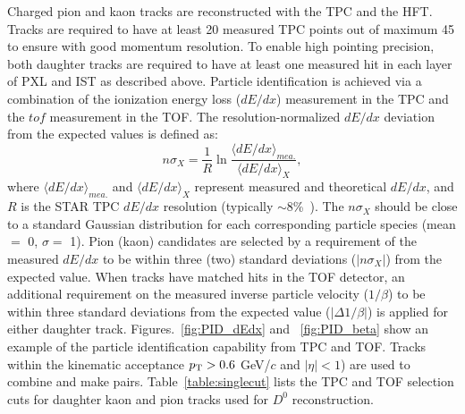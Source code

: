 \documentclass[%
 reprint,	
 amsmath,amssymb,
 aps,
 prc,
]{revtex4-1}
\begin{document}
Charged pion and kaon tracks are reconstructed with the TPC and the HFT. Tracks are required to have at least 20 measured TPC points out of maximum 45 to ensure with good momentum resolution. To enable high pointing precision, both daughter tracks are required to have at least one measured hit in each layer of PXL and IST as described above. Particle identification is achieved via a combination of the ionization energy loss ($dE/dx$) measurement in the TPC and the $tof$ measurement in the TOF. The resolution-normalized $dE/dx$ deviation from the expected values is defined as:
\begin{equation}
n\sigma_X = \frac{1}{R}\ln\frac{\langle{dE/dx}\rangle_{mea.}}{\langle{dE/dx}\rangle_{X}},
\label{equ:equation1}
\end{equation}
where $\langle{dE/dx}\rangle_{mea.}$ and $\langle{dE/dx}\rangle_{X}$ represent measured and theoretical $dE/dx$, and $R$ is the STAR TPC $dE/dx$ resolution (typically $\sim$8\%~\cite{TPC}). The $n\sigma_X$ should be close to a standard Gaussian distribution for each corresponding particle species (mean $=$ 0, $\sigma = $ 1).
Pion (kaon) candidates are selected by a requirement of the measured $dE/dx$ to be within three (two) standard deviations ($|n\sigma_{X}|$) from the expected value. When tracks have matched hits in the TOF detector, an additional requirement on the measured inverse particle velocity ($1/\beta$) to be within three standard deviations from the expected value ($|\Delta 1/\beta|$) is applied for either daughter track. Figures.~\ref{fig:PID_dEdx} and ~\ref{fig:PID_beta} show an example of the particle identification capability from TPC and TOF. Tracks within the kinematic acceptance $p_{\rm T}>0.6$ GeV/$c$ and $|\eta|<1$) are used to combine and make pairs. Table~\ref{table:singlecut} lists the TPC and TOF selection cuts for daughter kaon and pion tracks used for $D^0$ reconstruction.

\begin{table}
\label{table:singlecut} 
\end{table}
\end{document}
